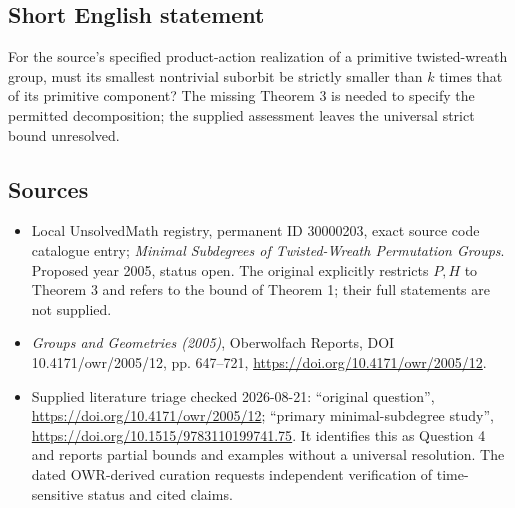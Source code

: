 \documentclass[11pt]{article}
\begin{document}
\subsection{Short English statement}
For the source's specified product-action realization of a primitive twisted-wreath group, must its smallest nontrivial suborbit be strictly smaller than $k$ times that of its primitive component? The missing Theorem 3 is needed to specify the permitted decomposition; the supplied assessment leaves the universal strict bound unresolved.
\subsection{Sources}
\begin{itemize}
\item Local UnsolvedMath registry, permanent ID 30000203, exact source code catalogue entry; \emph{Minimal Subdegrees of Twisted-Wreath Permutation Groups}. Proposed year 2005, status open. The original explicitly restricts $P,H$ to Theorem 3 and refers to the bound of Theorem 1; their full statements are not supplied.
\item \emph{Groups and Geometries (2005)}, Oberwolfach Reports, DOI 10.4171/owr/2005/12, pp. 647--721, \url{https://doi.org/10.4171/owr/2005/12}.
\item Supplied literature triage checked 2026-08-21: ``original question'', \url{https://doi.org/10.4171/owr/2005/12}; ``primary minimal-subdegree study'', \url{https://doi.org/10.1515/9783110199741.75}. It identifies this as Question 4 and reports partial bounds and examples without a universal resolution. The dated OWR-derived curation requests independent verification of time-sensitive status and cited claims.
\end{itemize}
\end{document}

